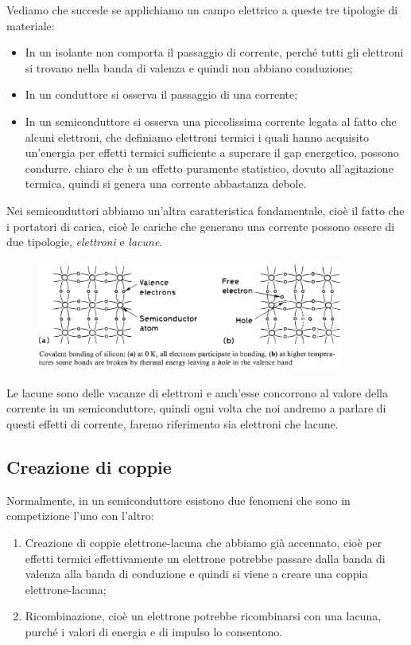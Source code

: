Vediamo che succede se applichiamo un campo elettrico a queste tre tipologie di materiale:
\begin{itemize}[leftmargin=0.5cm]
   \item In un isolante non comporta il passaggio di corrente, perché tutti gli elettroni si trovano nella banda di valenza e quindi non abbiano conduzione;
   \item In un conduttore si osserva il passaggio di una corrente;
   \item In un semiconduttore si osserva una piccolissima corrente legata al fatto che alcuni elettroni, che definiamo elettroni termici i quali hanno acquisito un'energia per effetti termici sufficiente a superare il gap energetico, possono condurre. \E chiaro che è un effetto puramente statistico, dovuto all'agitazione termica, quindi si genera una corrente abbastanza debole.
\end{itemize}
Nei semiconduttori abbiamo un'altra caratteristica fondamentale, cioè il fatto che i portatori di carica, cioè le cariche che generano una corrente possono essere di due tipologie, \textit{elettroni} e \textit{lacune}.
\begin{figure}[H]
   \centering
   \includegraphics[width=0.9\textwidth]{immagini/elettroni_e_lacune_semiconduttori.png}
\end{figure}
Le lacune sono delle vacanze di elettroni e anch'esse concorrono al valore della corrente in un semiconduttore, quindi ogni volta che noi andremo a parlare di questi effetti di corrente, faremo riferimento sia elettroni che lacune.

\subsection{Creazione di coppie}

Normalmente, in un semiconduttore esistono due fenomeni che sono in competizione l'uno con l'altro:

\begin{enumerate}[leftmargin=0.6cm]
   \item Creazione di coppie elettrone-lacuna che abbiamo già accennato, cioè per effetti termici effettivamente un elettrone potrebbe passare dalla banda di valenza alla banda di conduzione e quindi si viene a creare una coppia elettrone-lacuna;
   \item Ricombinazione, cioè un elettrone potrebbe ricombinarsi con una lacuna, purché i valori di energia e di impulso lo consentono.
\end{enumerate}

